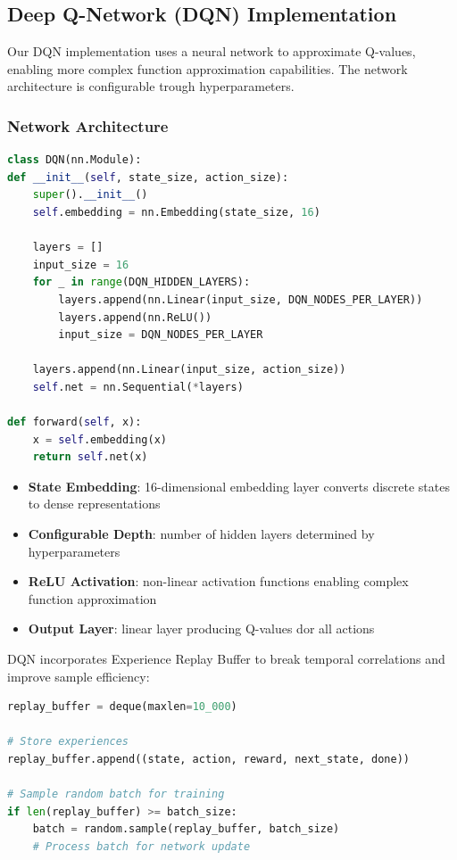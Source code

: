 \documentclass[a4paper,12pt]{article}
\begin{document}
\subsection{Deep Q-Network (DQN) Implementation}
Our DQN implementation uses a neural network to approximate Q-values, enabling more complex function approximation capabilities. The network architecture is configurable trough hyperparameters.
\subsubsection{Network Architecture}
\begin{lstlisting}[language=Python]
class DQN(nn.Module):
def __init__(self, state_size, action_size):
    super().__init__()
    self.embedding = nn.Embedding(state_size, 16)
    
    layers = []
    input_size = 16
    for _ in range(DQN_HIDDEN_LAYERS):
        layers.append(nn.Linear(input_size, DQN_NODES_PER_LAYER))
        layers.append(nn.ReLU())
        input_size = DQN_NODES_PER_LAYER
        
    layers.append(nn.Linear(input_size, action_size))
    self.net = nn.Sequential(*layers)

def forward(self, x):
    x = self.embedding(x)
    return self.net(x)
\end{lstlisting}
\begin{itemize}
    \item \textbf{State Embedding}: 16-dimensional embedding layer converts discrete states to dense representations
    \item \textbf{Configurable Depth}: number of hidden layers determined by hyperparameters
    \item \textbf{ReLU Activation}: non-linear activation functions enabling complex function approximation
    \item \textbf{Output Layer}: linear layer producing Q-values dor all actions
\end{itemize}
DQN incorporates Experience Replay Buffer to break temporal correlations and improve sample efficiency:
\begin{lstlisting}[language=Python]
replay_buffer = deque(maxlen=10_000)

# Store experiences
replay_buffer.append((state, action, reward, next_state, done))

# Sample random batch for training
if len(replay_buffer) >= batch_size:
    batch = random.sample(replay_buffer, batch_size)
    # Process batch for network update
\end{lstlisting}
\end{document}
